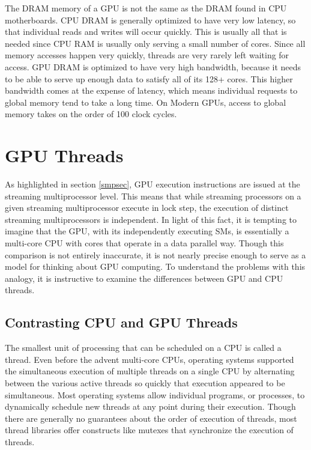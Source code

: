 \documentclass[12pt,twoside]{reedthesis}
\begin{document}
The DRAM memory of a GPU is not the same as the DRAM found in CPU motherboards. CPU DRAM is generally optimized to have very low latency, so that individual reads and writes will occur quickly. This is usually all that is needed since CPU RAM is usually only serving a small number of cores. Since all memory accesses happen very quickly, threads are very rarely left waiting for access. GPU DRAM is optimized to have very high bandwidth, because it needs to be able to serve up enough data to satisfy all of its 128+ cores. This higher bandwidth comes at the expense of latency, which means individual requests to global memory tend to take a long time. On Modern GPUs, access to global memory takes on the order of 100 clock cycles.

\section{GPU Threads}

As highlighted in section \ref{smpsec}, GPU execution instructions are issued at the streaming multiprocessor level. This means that while streaming processors on a given streaming multiprocessor execute in lock step, the execution of distinct streaming multiprocessors is independent. In light of this fact, it is tempting to imagine that the GPU, with its independently executing SMs, is essentially a multi-core CPU with cores that operate in a data parallel way. Though this comparison is not entirely inaccurate, it is not nearly precise enough to serve as a model for thinking about GPU computing. To understand the problems with this analogy, it is instructive to examine the differences between GPU and CPU threads.

\subsection{Contrasting CPU and GPU Threads}

The smallest unit of processing that can be scheduled on a CPU is called a thread. Even before the advent multi-core CPUs, operating systems supported the simultaneous execution of multiple threads on a single CPU by alternating between the various active threads so quickly that execution appeared to be simultaneous. Most operating systems allow individual programs, or processes, to dynamically schedule new threads at any point during their execution. Though there are generally no guarantees about the order of execution of threads, most thread libraries offer constructs like mutexes that synchronize the execution of threads.
\end{document}
